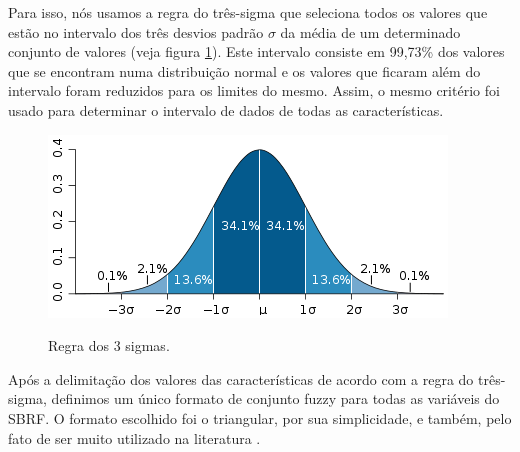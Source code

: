 \documentclass[template.tex]{subfiles}
\begin{document}

Para isso, nós usamos a regra do três-sigma \cite{kazmier2004schaum} que seleciona todos os valores que estão no intervalo dos três desvios padrão $\sigma$ da média de um determinado conjunto de valores (veja figura \ref{figura:regra_3_sigmas}). Este intervalo consiste em 99,73\% dos valores que se encontram numa distribuição normal e os valores que ficaram além do intervalo foram reduzidos para os limites do mesmo. Assim, o mesmo critério foi usado para determinar o intervalo de dados de todas as características. 

\begin{figure}[h]
\caption{Regra dos 3 sigmas.}
\centering
\includegraphics[scale=0.85]{regra-dos-3-sigma.png}
\label{figura:regra_3_sigmas}
\end{figure}

Após a delimitação dos valores das características de acordo com a regra do três-sigma, definimos um único formato de conjunto fuzzy para todas as variáveis do SBRF. O formato escolhido foi o triangular, por sua simplicidade, e também, pelo fato de ser muito utilizado na literatura \cite{alcala2009multiobjective, gacto2010integration, antonelli2012multi, cardenas2012multiobjective}.
\end{document}
